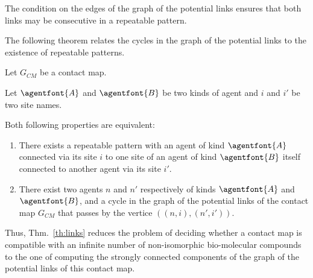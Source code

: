 \documentclass{entcs}
\newcommand{\graphsymb}{G}
\begin{document}
The condition on the edges of the graph of the potential links ensures that
both links may be consecutive in a repeatable pattern.

The following theorem relates the cycles in the graph of the potential links to the existence of repeatable patterns.

\begin{theorem}
  \label{th:link}
  Let $\graphsymb_{\textit{CM}}$ be a contact map.

Let $\agentfont{A}$ and $\agentfont{B}$ be two kinds of agent and
$i$ and $i'$ be two site names.

  Both following properties are equivalent:
  \begin{enumerate}
    \item There exists a repeatable pattern
    with an agent of kind $\agentfont{A}$ connected via its site $i$
    to one site of an agent of kind $\agentfont{B}$ itself connected to another agent via its site $i'$.
\item There exist two agents $n$ and $n'$ respectively of kinds $\agentfont{A}$
and  $\agentfont{B}$, and a  cycle in the graph of the potential links of the contact map    $\graphsymb_{\textit{CM}}$  that passes by the vertice  $((n,i),(n',i'))$.
  \end{enumerate}
\end{theorem}

Thus, Thm.~\ref{th:links} reduces the problem of deciding whether
a contact map is compatible with an infinite number of non-isomorphic bio-molecular compounds to the one of computing the strongly connected components of the graph of the potential links of this contact map.
\end{document}
